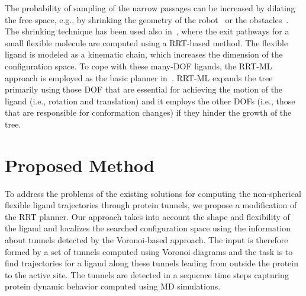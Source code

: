 \documentclass[usletter, 10pt, conference]{ieeeconf} %
\begin{document}
The probability of sampling of the narrow passages can be increased by dilating the free-space, e.g., by shrinking the geometry of 
the robot~\cite{hsuOnProb} or the obstacles~\cite{bayazitIRC}.
The shrinking technique has been used also in~\cite{cortes2010simulating}, where the exit pathways for a small flexible molecule are
computed using a RRT-based method.
The flexible ligand is modeled as a kinematic chain, which increases the dimension of the configuration space.
To cope with these many-DOF ligands, the RRT-ML~\cite{cortes2007mlrrt} approach is employed as the basic planner in~\cite{cortes2010simulating}.
RRT-ML expands the tree primarily using those DOF that are essential for achieving the motion of the ligand (i.e., rotation
and translation) and it employs the other DOFs (i.e., those that are responsible for conformation changes) if they hinder the growth of the tree.




\section{Proposed Method}
To address the problems of the existing solutions for computing the non-spherical flexible ligand trajectories through protein tunnels, we propose a modification of the RRT planner. 
Our approach takes into account the shape and flexibility of the ligand and localizes the searched configuration space using the information about tunnels detected by the Voronoi-based approach.
The input is therefore formed by a set of tunnels computed using Voronoi diagrams and the task is to find trajectories for a ligand along these tunnels
leading from outside the protein to the active site.
The tunnels are detected in a sequence time steps capturing protein dynamic behavior computed using MD simulations. 
\end{document}
